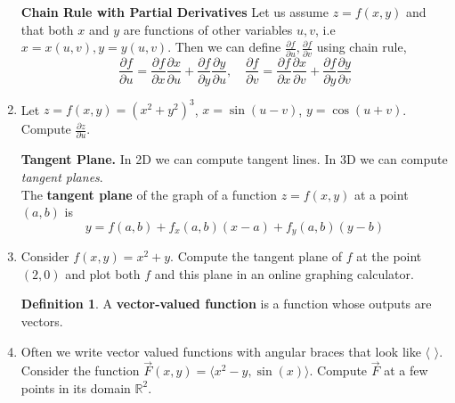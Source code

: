 \documentclass[12pt]{amsart}
\newcommand{\R}{\mathbb{R}}
\theoremstyle{definition}
\newtheorem*{definition}{Definition}
\begin{document}
\begin{enumerate}[itemsep=2.5em,leftmargin=0pt]
\vspace{2.5em}

\noindent \textbf{Chain Rule with Partial Derivatives} Let us assume $z= f(x,y)$ and that both $x$ and $y$ are functions of other variables $u, v$, i.e $x= x(u,v), y= y(u,v)$. Then we can define $\frac{\partial f}{\partial u}, \frac{\partial f}{\partial v}$ using chain rule,
        $$\frac{\partial f}{\partial u} = \frac{\partial f}{\partial x} \frac{\partial x}{\partial u}+ \frac{\partial f}{\partial y} \frac{\partial y}{\partial u}, \quad  \frac{\partial f}{\partial v} = \frac{\partial f}{\partial x} \frac{\partial x}{\partial v}+ \frac{\partial f}{\partial y} \frac{\partial y}{\partial v}$$

\vspace{-2em}

\item  Let $z= f(x,y) =(x^2 + y^2)^3$, $x = \sin (u-v)$, $y = \cos (u+v)$. Compute $\frac{\partial z}{\partial u}$. 

\vspace{2.5em}

\noindent \textbf{Tangent Plane.} In 2D we can compute tangent lines. In 3D we can compute \textit{tangent planes}. \\

\noindent The \textbf{tangent plane} of the graph of a function $z=f(x,y)$ at a point $(a,b)$ is
\[
    y = f(a,b) + f_x(a,b)(x-a) + f_y(a,b)(y-b)
\]

\vspace{-2em}

\item Consider $f(x,y)=x^2+y$. Compute the tangent plane of $f$ at the point $(2,0)$ and plot both $f$ and this plane in an online graphing calculator.

\vspace{2.5em}

\begin{definition}
    A \textbf{vector-valued function} is a function whose outputs are vectors.
\end{definition}

\vspace{-2em}

\item Often we write vector valued functions with angular braces that look like $\langle$ $\rangle$. Consider the function $\vec{F}(x,y)=\langle x^2-y, \sin(x) \rangle$. Compute $\vec{F}$ at a few points in its domain $\R^2$.


\end{enumerate}
\end{document}
